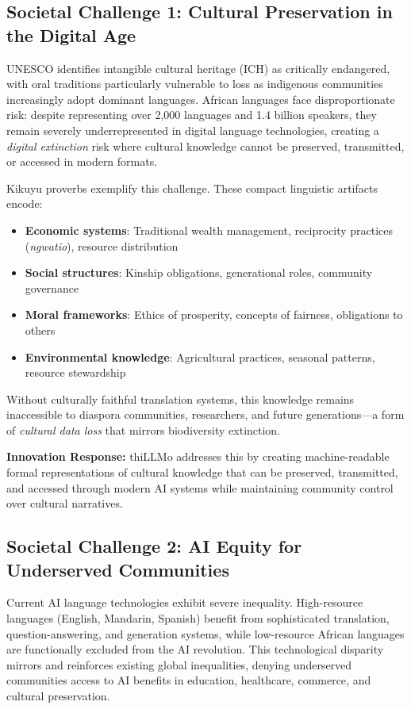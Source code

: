 \documentclass[11pt,a4paper]{article}
\begin{document}
\subsection*{Societal Challenge 1: Cultural Preservation in the Digital Age}

UNESCO identifies intangible cultural heritage (ICH) as critically endangered, with oral traditions particularly vulnerable to loss as indigenous communities increasingly adopt dominant languages. African languages face disproportionate risk: despite representing over 2,000 languages and 1.4 billion speakers, they remain severely underrepresented in digital language technologies, creating a \emph{digital extinction} risk where cultural knowledge cannot be preserved, transmitted, or accessed in modern formats.

Kikuyu proverbs exemplify this challenge. These compact linguistic artifacts encode:
\begin{itemize}
    \item \textbf{Economic systems}: Traditional wealth management, reciprocity practices (\emph{ngwatio}), resource distribution
    \item \textbf{Social structures}: Kinship obligations, generational roles, community governance
    \item \textbf{Moral frameworks}: Ethics of prosperity, concepts of fairness, obligations to others
    \item \textbf{Environmental knowledge}: Agricultural practices, seasonal patterns, resource stewardship
\end{itemize}

Without culturally faithful translation systems, this knowledge remains inaccessible to diaspora communities, researchers, and future generations---a form of \emph{cultural data loss} that mirrors biodiversity extinction.

\textbf{Innovation Response:} thiLLMo addresses this by creating machine-readable formal representations of cultural knowledge that can be preserved, transmitted, and accessed through modern AI systems while maintaining community control over cultural narratives.

\subsection*{Societal Challenge 2: AI Equity for Underserved Communities}

Current AI language technologies exhibit severe inequality. High-resource languages (English, Mandarin, Spanish) benefit from sophisticated translation, question-answering, and generation systems, while low-resource African languages are functionally excluded from the AI revolution. This technological disparity mirrors and reinforces existing global inequalities, denying underserved communities access to AI benefits in education, healthcare, commerce, and cultural preservation.
\end{document}
